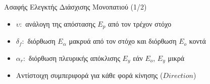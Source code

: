 \documentclass[10pt, compress]{beamer}
\begin{document}
%	

\begin{frame}{Ασαφής Ελεγκτής Διάσχισης Μονοπατιού (1/2)}
	\begin{figure}
		\hspace{1cm}
	\end{figure}
	
	\begin{itemize}
		\item $\upsilon:$ ανάλογη της απόστασης $E_p$ από τον τρέχον στόχο
		\item $\delta_f:$ διόρθωση $E_\alpha$ μακρυά από τον στόχο και διόρθωση $E_o$ κοντά
		\item $\alpha_r:$ διόρθωση πλευρικής απόκλισης $E_y$ εάν $E_o$, $E_y$ μικρά
		\item Αντίστοιχη συμπεριφορά για κάθε φορά κίνησης ($Direction$)
	\end{itemize}
\end{frame}
\end{document}
